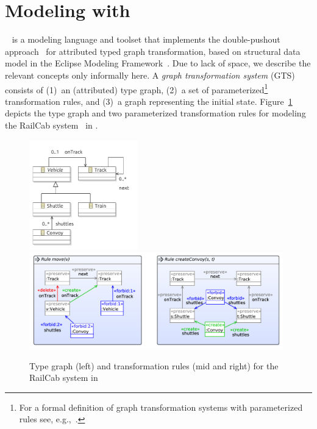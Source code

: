 
\newpage
\section{Modeling with \henshin}
\label{sec:modeling}

\newcommand{\action}[1]{\ensuremath{\langle\!\langle\mathsf{#1}\rangle\!\rangle}}

\henshin~\cite{henshin,henshin-website} is a modeling language and toolset that implements the double-pushout approach~\cite{Corradini97} for attributed typed graph transformation, based on structural data model in the Eclipse Modeling Framework~\cite{EMF}. Due to lack of space, we describe the relevant concepts only informally here. A \emph{graph transformation system} (GTS) consists of (1)~an (attributed) type graph, (2)~a set of parameterized\footnote{For a formal definition of graph transformation systems with parameterized rules see, e.g.,~\cite{HGM06}.} transformation rules, and (3)~a graph representing the initial state. Figure~\ref{fig:railcab} depicts the type graph and two parameterized transformation rules for modeling the RailCab system~\cite{RailCab} in \henshin.

\begin{figure}[t!]
\centering
\includegraphics[width=4.7cm]{images/classes}\hspace{3mm}%
\includegraphics[width=11cm]{images/rules}
\vspace{-7mm}
\caption{Type graph (left) and transformation rules (mid and right) for the RailCab system in \henshin}
\label{fig:railcab}
\end{figure}

